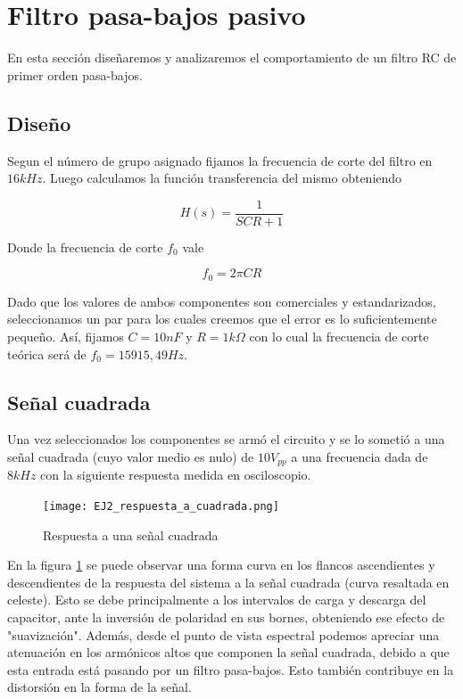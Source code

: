 
\section{Filtro pasa-bajos pasivo}

En esta secci\'on dise\~naremos y analizaremos el comportamiento de un filtro RC de primer orden pasa-bajos.

\subsection{Dise\~no}
Segun el n\'umero de grupo asignado fijamos la frecuencia de corte del filtro en $16kHz$. Luego calculamos la funci\'on transferencia del mismo obteniendo

\begin{equation}\label{ganancia_2}
H(s) = \frac{1}{SCR+1}
\end{equation}

Donde la frecuencia de corte $f_{0}$ vale

\begin{equation}\label{freccorte_2}
f_{0} = 2\pi CR
\end{equation}

Dado que los valores de ambos componentes son comerciales y estandarizados, seleccionamos un par para los cuales creemos que el error es lo suficientemente peque\~no. As\'i, fijamos $C=10nF$ y $R=1k\Omega$ con lo cual la frecuencia de corte te\'orica ser\'a de $f_{0}=15915,49Hz$.

\subsection{Se\~nal cuadrada}

Una vez seleccionados los componentes se arm\'o el circuito y se lo someti\'o a una se\~nal cuadrada (cuyo valor medio es nulo) de $10V_{pp}$ a una frecuencia dada de $8kHz$ con la siguiente respuesta medida en osciloscopio.

\begin{figure}[h!]
    \centering
    \texttt{[image: EJ2\_respuesta\_a\_cuadrada.png]}
    \caption{Respuesta a una se\~nal cuadrada}
    \label{fig:rtacuad_2} 
\end{figure}

En la figura \ref{fig:rtacuad_2} se puede observar una forma curva en los flancos ascendientes y descendientes de la respuesta del sistema a la se\~nal cuadrada (curva resaltada en celeste). Esto se debe principalmente a los intervalos de carga y descarga del capacitor, ante la inversi\'on de polaridad en sus bornes, obteniendo ese efecto de "suavizaci\'on". Adem\'as, desde el punto de vista espectral podemos apreciar una atenuaci\'on en los arm\'onicos altos que componen la se\~nal cuadrada, debido a que esta entrada est\'a pasando por un filtro pasa-bajos. Esto tambi\'en contribuye en la distorsi\'on en la forma de la se\~nal.


